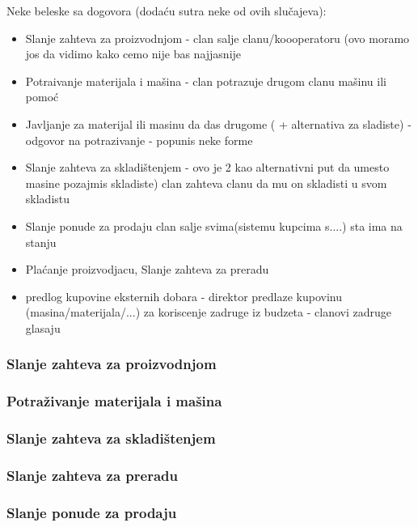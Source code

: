 \documentclass[a4paper]{article}
\begin{document}
Neke beleske sa dogovora (dodaću sutra neke od ovih slučajeva): 
\begin{itemize}
  \item Slanje zahteva za proizvodnjom - clan salje clanu/koooperatoru (ovo moramo jos da vidimo kako cemo nije bas najjasnije

  \item Potraivanje materijala i mašina - clan potrazuje drugom clanu mašinu ili pomoć
  
  \item Javljanje za materijal ili masinu da das drugome  ( + alternativa za sladiste) - odgovor na potrazivanje - popunis neke forme
  
  \item Slanje zahteva za skladištenjem - ovo je 2 kao alternativni put da umesto masine pozajmis skladiste)
  clan zahteva clanu da mu on skladisti u svom skladistu 
  
  \item Slanje ponude za prodaju
   clan salje svima(sistemu kupcima s....) sta ima na stanju 

  \item Plaćanje proizvodjacu, Slanje zahteva za preradu
  
  \item predlog kupovine eksternih dobara - direktor predlaze kupovinu (masina/materijala/...) za koriscenje zadruge iz budzeta - clanovi zadruge glasaju 
  
\end{itemize}


\subsubsection{Slanje zahteva za proizvodnjom}
\subsubsection{Potraživanje materijala i mašina}
\subsubsection{Slanje zahteva za skladištenjem}
\subsubsection{Slanje zahteva za preradu}
\subsubsection{Slanje ponude za prodaju}
\end{document}
